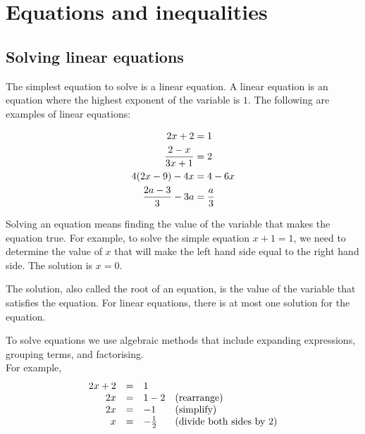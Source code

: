 \chapter{Equations and inequalities}
\setcounter{figure}{1}
\setcounter{subfigure}{1}

\section{Solving linear equations}
         
The simplest equation to solve is a linear equation. A linear equation is an
equation where the highest exponent of the variable is $1$. The
following are examples of linear equations:\par 

\begin{align*}
  2x+2 &= 1 \vspace{6pt} \\
  \dfrac{2-x}{3x+1} &= 2 \vspace{6pt} \\
  4(2x-9)-4x &= 4-6x \vspace{6pt} \\ 
  \dfrac{2a-3}{3}-3a &= \dfrac{a}{3}
\end{align*}



Solving an equation means finding the value of the variable that makes
the equation true. For example, to solve the simple equation $x+1=1$,
we need to determine the value of $x$ that will make the left hand
side equal to the right hand side. The solution is $x=0$.\par

The solution, also called the root of an equation, is the value of the
variable that satisfies the equation. For linear equations, there is
at most one solution for the equation.\par

To solve equations we use algebraic methods that include expanding
expressions, grouping terms, and factorising. \\
For example,
\begin{equation*}
  \begin{array}{ccll}
    \hfill 2x+2& =& 1\hfill \\ 
    \hfill 2x& =& 1-2\hfill & \mbox{(rearrange)}\hfill \\ 
    \hfill 2x& =& -1\hfill & \mbox{(simplify)}\hfill \\
    \hfill x&=& -\frac{1}{2} & \mbox{(divide both sides by $2$)} \hfill
  \end{array}
\end{equation*}

